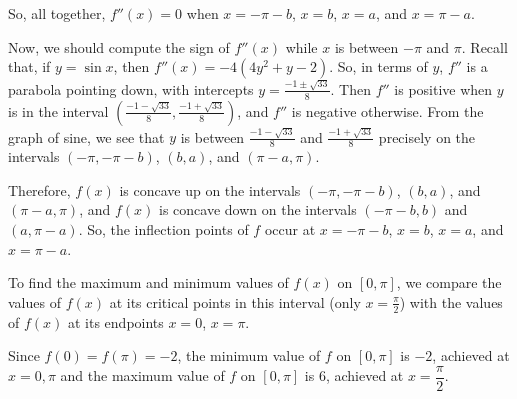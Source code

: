 \begin{solution}
\begin{itemize}
So, all together, $f''(x)=0$ when $x=-\pi-b$, $x=b$, $x=a$, and $x=\pi-a$.

Now, we should compute the sign of $f''(x)$ while $x$ is between $-\pi$ and $\pi$. Recall that, if $y=\sin x$, then $f''(x)=-4(4y^2+y-2)$. So, in terms of $y$, $f''$ is a parabola pointing down, with intercepts $y=\frac{-1\pm\sqrt{33}}{8}$. Then $f''$ is positive when $y$ is in the interval $\left(\frac{-1-\sqrt{33}}{8},\frac{-1+\sqrt{33}}{8}\right)$, and $f''$ is negative otherwise. From the graph of sine, we see that $y$  is between
$\frac{-1-\sqrt{33}}{8}$ and $\frac{-1+\sqrt{33}}{8}$ precisely on the intervals $(-\pi,-\pi-b)$,
$(b,a)$, and $(\pi-a,\pi)$.

Therefore,
$f(x)$ is concave up on the intervals $(-\pi,-\pi-b)$, $(b,a)$, and $(\pi-a,\pi)$, and
$f(x)$ is concave down on the intervals $(-\pi-b,b)$ and $(a,\pi-a)$. So, the inflection points of $f$ occur at
 $x=-\pi-b$, $x=b$, $x=a$, and $x=\pi-a$.
\end{itemize}
\begin{center}\end{center}

To find the maximum and minimum values of $f(x)$ on $[0,\pi]$, we compare the values of $f(x)$ at its critical points in this interval (only $x=\frac{\pi}{2}$) with the values of $f(x)$ at its endpoints $x=0$, $x=\pi$.

Since $f(0)=f(\pi)=-2$, the minimum value
of $f$ on $[0,\pi]$ is $-2$, achieved at $x=0,\pi$ and the maximum
value of $f$  on $[0,\pi]$ is $6$, achieved at $x=\dfrac{\pi}{2}$.
\end{solution}


